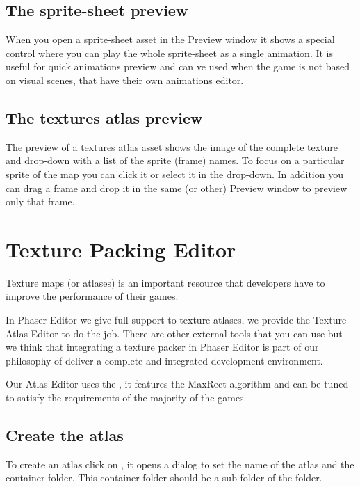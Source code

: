 \documentclass[letterpaper,10pt,english]{sphinxmanual}
\begin{document}
\section{The sprite-sheet preview}
\label{\detokenize{preview_window:the-sprite-sheet-preview}}
When you open a sprite-sheet asset in the Preview window it shows a special control where you can play the whole sprite-sheet as a single animation. It is useful for quick animations preview and can ve used when the game is not based on visual scenes, that have their own animations editor.

\noindent{}


\section{The textures atlas preview}
\label{\detokenize{preview_window:the-textures-atlas-preview}}
The preview of a textures atlas asset shows the image of the complete texture and drop-down with a list of the sprite (frame) names. To focus on a particular sprite of the map you can click it or select it in the drop-down. In addition you can drag a frame and drop it in the same (or other) Preview window to preview only that frame.

\noindent{}


\chapter{Texture Packing Editor}
\label{\detokenize{texture_packer::doc}}\label{\detokenize{texture_packer:texture-packing-editor}}
Texture maps (or atlases) is an important resource that developers have to improve the performance of their games.

In Phaser Editor we give full support to texture atlases, we provide the Texture Atlas Editor to do the job. There are other external tools that you can use but we think that integrating a texture packer in Phaser Editor is part of our philosophy of deliver a complete and integrated development environment.

Our Atlas Editor uses the , it features the MaxRect algorithm and can be tuned to satisfy the requirements of the majority of the games.


\section{Create the atlas}
\label{\detokenize{texture_packer:create-the-atlas}}
To create an atlas click on , it opens a dialog to set the name of the atlas and the container folder. This container folder should be a sub-folder of the  folder.
\end{document}
